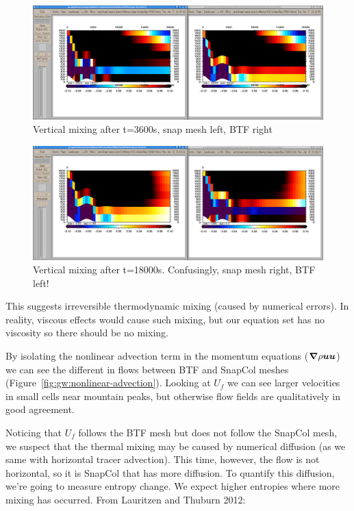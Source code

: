 \begin{figure}
\includegraphics[width=\textwidth]{interim-results/gravityWavesBTFsnapMidZoom3600.png}
\caption{Vertical mixing after t=3600s, snap mesh left, BTF right}
\label{fig:gw:mixing-3600s}
\end{figure}

\begin{figure}
\includegraphics[width=\textwidth]{interim-results/gravityWavesBTFsnapMidZoom18000.png}
\caption{Vertical mixing after t=18000s.  Confusingly, snap mesh right, BTF left!}
\label{fig:gw:mixing-18000s}
\end{figure}

This suggests irreversible thermodynamic mixing (caused by numerical errors).  In reality, viscous effects would cause such mixing, but our equation set has no viscosity so there should be no mixing.

By isolating the nonlinear advection term in the momentum equations ($\boldsymbol{\nabla} \rho \bm{u} \bm{u}$) we can see the different in flows between BTF and SnapCol meshes (Figure~\ref{fig:gw:nonlinear-advection}).  Looking at $U_f$ we can see larger velocities in small cells near mountain peaks, but otherwise flow fields are qualitatively in good agreement.

Noticing that $U_f$ follows the BTF mesh but does not follow the SnapCol mesh, we suspect that the thermal mixing may be caused by numerical diffusion (as we same with horizontal tracer advection).  This time, however, the flow is not horizontal, so it is SnapCol that has more diffusion.  To quantify this diffusion, we're going to measure entropy change.  We expect higher entropies where more mixing has occurred.  From Lauritzen and Thuburn 2012:

